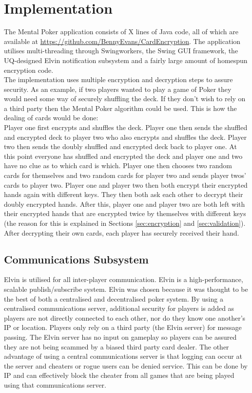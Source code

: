 \documentclass[11pt, oneside]{article}   	%
\begin{document}
\section{Implementation}

The Mental Poker application consists of X lines of Java code, all of which are available at \url{https://github.com/BennyEvans/CardEncryption}. The application utilises multi-threading through Swingworkers, the Swing GUI framework, the UQ-designed Elvin notification subsystem and a fairly large amount of homespun encryption code.\\

The implementation uses multiple encryption and decryption steps to assure security. As an example, if two players wanted to play a game of Poker they would need some way of securely shuffling the deck. If they don’t wish to rely on a third party then the Mental Poker algorithm could be used. This is how the dealing of cards would be done:\\

Player one first encrypts and shuffles the deck. Player one then sends the shuffled and encrypted deck to player two who also encrypts and shuffles the deck. Player two then sends the doubly shuffled and encrypted deck back to player one. At this point everyone has shuffled and encrypted the deck and player one and two have no clue as to which card is which. Player one then chooses two random cards for themselves and two random cards for player two and sends player twos’ cards  to player two. Player one and player two then both encrypt their encrypted hands again with different keys. They then both ask each other to decrypt their doubly encrypted hands. After this, player one and player two are both left with their encrypted hands that are encrypted twice by themselves with different keys (the reason for this is explained in Sections \ref{sec:encryption} and \ref{sec:validation}). After decrypting their own cards, each player has securely received their hand.

\subsection{Communications Subsystem}
\label{sec:comsubsys}				

Elvin is utilised for all inter-player communication. Elvin is a high-performance, scalable publish/subscribe system. Elvin was chosen because it was thought to be the best of both a centralised and decentralised poker system. By using a centralised communications server, additional security for players is added as players are not directly connected to each other, nor do they know one another's IP or location. Players only rely on a third party (the Elvin server) for message passing. The Elvin server has no input on gameplay so players can be assured they are not being scammed by a biased third party card dealer. The other advantage of using a central communications server is that logging can occur at the server and cheaters or rogue users can be denied service. This can be done by IP and can effectively block the cheater from all games that are being played using that communications server.\\
\end{document}
